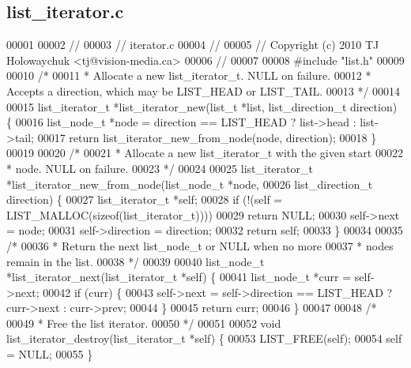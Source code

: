 \subsection{list\+\_\+iterator.\+c}
\label{a00113_source}

\begin{DoxyCode}
00001 
00002 \textcolor{comment}{//}
00003 \textcolor{comment}{// iterator.c}
00004 \textcolor{comment}{//}
00005 \textcolor{comment}{// Copyright (c) 2010 TJ Holowaychuk <tj@vision-media.ca>}
00006 \textcolor{comment}{//}
00007 
00008 \textcolor{preprocessor}{#include "list.h"}
00009 
00010 \textcolor{comment}{/*}
00011 \textcolor{comment}{ * Allocate a new list\_iterator\_t. NULL on failure.}
00012 \textcolor{comment}{ * Accepts a direction, which may be LIST\_HEAD or LIST\_TAIL.}
00013 \textcolor{comment}{ */}
00014 
00015 list_iterator_t *list_iterator_new(list_t *list, list_direction_t direction) \{
00016   list_node_t *node = direction == LIST_HEAD ? list->head : list->tail;
00017   \textcolor{keywordflow}{return} list_iterator_new_from_node(node, direction);
00018 \}
00019 
00020 \textcolor{comment}{/*}
00021 \textcolor{comment}{ * Allocate a new list\_iterator\_t with the given start}
00022 \textcolor{comment}{ * node. NULL on failure.}
00023 \textcolor{comment}{ */}
00024 
00025 list_iterator_t *list_iterator_new_from_node(list_node_t *node,
00026                                              list_direction_t direction) \{
00027   list_iterator_t *\textcolor{keyword}{self};
00028   \textcolor{keywordflow}{if} (!(\textcolor{keyword}{self} = LIST_MALLOC(\textcolor{keyword}{sizeof}(list_iterator_t))))
00029     \textcolor{keywordflow}{return} NULL;
00030   \textcolor{keyword}{self}->next = node;
00031   \textcolor{keyword}{self}->direction = direction;
00032   \textcolor{keywordflow}{return} \textcolor{keyword}{self};
00033 \}
00034 
00035 \textcolor{comment}{/*}
00036 \textcolor{comment}{ * Return the next list\_node\_t or NULL when no more}
00037 \textcolor{comment}{ * nodes remain in the list.}
00038 \textcolor{comment}{ */}
00039 
00040 list_node_t *list_iterator_next(list_iterator_t *\textcolor{keyword}{self}) \{
00041   list_node_t *curr = \textcolor{keyword}{self}->next;
00042   \textcolor{keywordflow}{if} (curr) \{
00043     \textcolor{keyword}{self}->next = \textcolor{keyword}{self}->direction == LIST_HEAD ? curr->next : curr->prev;
00044   \}
00045   \textcolor{keywordflow}{return} curr;
00046 \}
00047 
00048 \textcolor{comment}{/*}
00049 \textcolor{comment}{ * Free the list iterator.}
00050 \textcolor{comment}{ */}
00051 
00052 \textcolor{keywordtype}{void} list_iterator_destroy(list_iterator_t *\textcolor{keyword}{self}) \{
00053   LIST_FREE(\textcolor{keyword}{self});
00054   \textcolor{keyword}{self} = NULL;
00055 \}
\end{DoxyCode}
